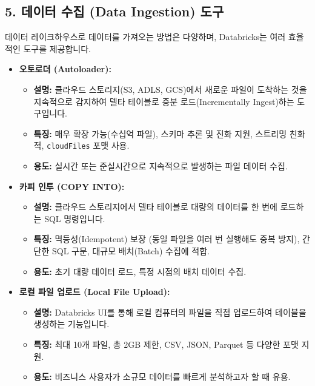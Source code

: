 \documentclass[11pt,a4paper]{article}
\theoremstyle{definition}
\begin{document}
\subsection*{5. 데이터 수집 (Data Ingestion) 도구}

데이터 레이크하우스로 데이터를 가져오는 방법은 다양하며, Databricks는 여러 효율적인 도구를 제공합니다.

\begin{tcolorbox}[title=\textbf{Databricks 데이터 수집 도구}, colback=lime!5!white, colframe=lime!75!black, sharp corners, boxrule=0.8pt]
\begin{itemize}
    \item \textbf{오토로더 (Autoloader):}
    \begin{itemize}
        \item \textbf{설명:} 클라우드 스토리지(S3, ADLS, GCS)에서 새로운 파일이 도착하는 것을 지속적으로 감지하여 델타 테이블로 증분 로드(Incrementally Ingest)하는 도구입니다.
        \item \textbf{특징:} 매우 확장 가능(수십억 파일), 스키마 추론 및 진화 지원, 스트리밍 친화적, \texttt{cloudFiles} 포맷 사용.
        \item \textbf{용도:} 실시간 또는 준실시간으로 지속적으로 발생하는 파일 데이터 수집.
    \end{itemize}
    \item \textbf{카피 인투 (COPY INTO):}
    \begin{itemize}
        \item \textbf{설명:} 클라우드 스토리지에서 델타 테이블로 대량의 데이터를 한 번에 로드하는 SQL 명령입니다.
        \item \textbf{특징:} 멱등성(Idempotent) 보장 (동일 파일을 여러 번 실행해도 중복 방지), 간단한 SQL 구문, 대규모 배치(Batch) 수집에 적합.
        \item \textbf{용도:} 초기 대량 데이터 로드, 특정 시점의 배치 데이터 수집.
    \end{itemize}
    \item \textbf{로컬 파일 업로드 (Local File Upload):}
    \begin{itemize}
        \item \textbf{설명:} Databricks UI를 통해 로컬 컴퓨터의 파일을 직접 업로드하여 테이블을 생성하는 기능입니다.
        \item \textbf{특징:} 최대 10개 파일, 총 2GB 제한, CSV, JSON, Parquet 등 다양한 포맷 지원.
        \item \textbf{용도:} 비즈니스 사용자가 소규모 데이터를 빠르게 분석하고자 할 때 유용.
    \end{itemize}

\end{itemize}
\end{tcolorbox}
\end{document}
